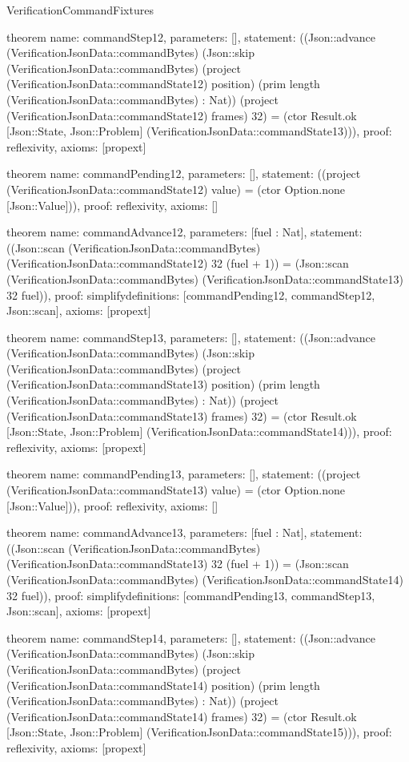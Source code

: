 \begin{lexlean}{VerificationCommandFixtures}
\begin{semanticmodule}
theorem{
  name: commandStep12,
  parameters: [],
  statement: ((Json::advance (VerificationJsonData::commandBytes) (Json::skip (VerificationJsonData::commandBytes) (project (VerificationJsonData::commandState12) position) (prim length (VerificationJsonData::commandBytes) : Nat)) (project (VerificationJsonData::commandState12) frames) 32) = (ctor Result.ok [Json::State, Json::Problem] (VerificationJsonData::commandState13))),
  proof: reflexivity{},
  axioms: [propext]
}

theorem{
  name: commandPending12,
  parameters: [],
  statement: ((project (VerificationJsonData::commandState12) value) = (ctor Option.none [Json::Value])),
  proof: reflexivity{},
  axioms: []
}

theorem{
  name: commandAdvance12,
  parameters: [fuel : Nat],
  statement: ((Json::scan (VerificationJsonData::commandBytes) (VerificationJsonData::commandState12) 32 (fuel + 1)) = (Json::scan (VerificationJsonData::commandBytes) (VerificationJsonData::commandState13) 32 fuel)),
  proof: simplify{definitions: [commandPending12, commandStep12, Json::scan]},
  axioms: [propext]
}

theorem{
  name: commandStep13,
  parameters: [],
  statement: ((Json::advance (VerificationJsonData::commandBytes) (Json::skip (VerificationJsonData::commandBytes) (project (VerificationJsonData::commandState13) position) (prim length (VerificationJsonData::commandBytes) : Nat)) (project (VerificationJsonData::commandState13) frames) 32) = (ctor Result.ok [Json::State, Json::Problem] (VerificationJsonData::commandState14))),
  proof: reflexivity{},
  axioms: [propext]
}

theorem{
  name: commandPending13,
  parameters: [],
  statement: ((project (VerificationJsonData::commandState13) value) = (ctor Option.none [Json::Value])),
  proof: reflexivity{},
  axioms: []
}

theorem{
  name: commandAdvance13,
  parameters: [fuel : Nat],
  statement: ((Json::scan (VerificationJsonData::commandBytes) (VerificationJsonData::commandState13) 32 (fuel + 1)) = (Json::scan (VerificationJsonData::commandBytes) (VerificationJsonData::commandState14) 32 fuel)),
  proof: simplify{definitions: [commandPending13, commandStep13, Json::scan]},
  axioms: [propext]
}

theorem{
  name: commandStep14,
  parameters: [],
  statement: ((Json::advance (VerificationJsonData::commandBytes) (Json::skip (VerificationJsonData::commandBytes) (project (VerificationJsonData::commandState14) position) (prim length (VerificationJsonData::commandBytes) : Nat)) (project (VerificationJsonData::commandState14) frames) 32) = (ctor Result.ok [Json::State, Json::Problem] (VerificationJsonData::commandState15))),
  proof: reflexivity{},
  axioms: [propext]
}


\end{semanticmodule}
\end{lexlean}
